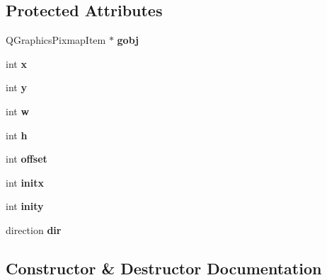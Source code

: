 \subsection*{Protected Attributes}
\begin{DoxyCompactItemize}
\item 
\hypertarget{class_personnage_a6b996f03f323c2c74c5087ea69845a12}{}Q\+Graphics\+Pixmap\+Item $\ast$ {\bfseries gobj}\label{class_personnage_a6b996f03f323c2c74c5087ea69845a12}

\item 
\hypertarget{class_personnage_aed98af55dd1a3b21c5a446713061b67e}{}int {\bfseries x}\label{class_personnage_aed98af55dd1a3b21c5a446713061b67e}

\item 
\hypertarget{class_personnage_a4fdc0728efe8d50059d81a7672c86555}{}int {\bfseries y}\label{class_personnage_a4fdc0728efe8d50059d81a7672c86555}

\item 
\hypertarget{class_personnage_ab246d91c6787ccd5cec5664f7e5d478a}{}int {\bfseries w}\label{class_personnage_ab246d91c6787ccd5cec5664f7e5d478a}

\item 
\hypertarget{class_personnage_a5dd35ace58df8299a92fddee390e1e55}{}int {\bfseries h}\label{class_personnage_a5dd35ace58df8299a92fddee390e1e55}

\item 
\hypertarget{class_personnage_a9ea72b045c379d8fa5938fcb7129ace2}{}int {\bfseries offset}\label{class_personnage_a9ea72b045c379d8fa5938fcb7129ace2}

\item 
\hypertarget{class_personnage_a7a74d1843f448cb007e5c4db909f9bac}{}int {\bfseries initx}\label{class_personnage_a7a74d1843f448cb007e5c4db909f9bac}

\item 
\hypertarget{class_personnage_ac94d042476be54e7a84446a35aaa82e1}{}int {\bfseries inity}\label{class_personnage_ac94d042476be54e7a84446a35aaa82e1}

\item 
\hypertarget{class_personnage_a03d309b13ca5e26fcc04dca85378baf8}{}direction {\bfseries dir}\label{class_personnage_a03d309b13ca5e26fcc04dca85378baf8}

\end{DoxyCompactItemize}


\subsection{Constructor \& Destructor Documentation}
\hypertarget{class_personnage_ab4bac03083b369311944718bbad4e7dc}{}
